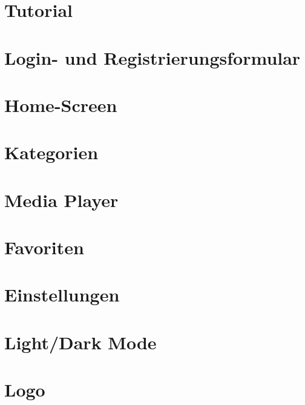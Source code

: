 \section{Tutorial}


\section{Login- und Registrierungsformular}


\section{Home-Screen}


\section{Kategorien}


\section{Media Player}


\section{Favoriten}


\section{Einstellungen}


\section{Light/Dark Mode}


\section{Logo}

